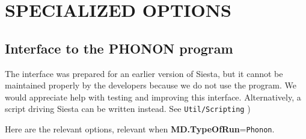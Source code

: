 \documentclass[11pt]{article}
\begin{document}
\section{SPECIALIZED OPTIONS}

\subsection{Interface to the PHONON program}
\label{sec:phonon-interface}

The interface was prepared for an earlier version of {\sc Siesta}, but
it cannot be maintained properly by the developers because we do not
use the program. We would appreciate help with testing and improving
this interface. Alternatively, a script driving Siesta can be written
instead. See {\tt Util/Scripting} )

Here are the relevant options, relevant when {\bf MD.TypeOfRun}={\tt Phonon}.
\end{document}
